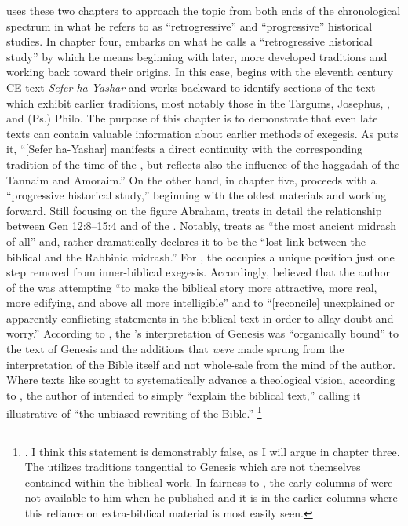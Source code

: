 \vermes uses these two chapters to approach the topic from both ends of the chronological spectrum in what he refers to as ``retrogressive'' and ``progressive'' historical studies. In chapter four, \vermes embarks on what he calls a ``retrogressive historical study'' by which he means beginning with later, more developed traditions and working back toward their origins. In this case, \vermes begins with the eleventh century CE text \emph{Sefer ha-Yashar} and works backward to identify sections of the text which exhibit earlier traditions, most notably those in the Targums, Josephus, \jub, and (Ps.) Philo. The purpose of this chapter is to demonstrate that even late texts can contain valuable information about earlier methods of exegesis. As \vermes puts it, ``[Sefer ha-Yashar] manifests a direct continuity with the corresponding tradition of the time of the \secondtemple, but reflects also the influence of the haggadah of the Tannaim and Amoraim.''%
    \autocite[95]{vermes1961}
On the other hand, in chapter five, \vermes proceeds with a ``progressive historical study,'' beginning with the oldest materials and working forward. Still focusing on the figure Abraham, \vermes treats in detail the relationship between Gen 12:8--15:4 and  of the \ga. Notably, \vermes treats \ga as ``the most ancient midrash of all''%
    \autocite[124]{vermes1961}
and, rather dramatically declares it to be the ``lost link between the biblical and the Rabbinic midrash.''%
    \autocite[124]{vermes1961}
For \vermes, the \ga occupies a unique position just one step removed from inner-biblical exegesis. Accordingly, \vermes believed that the author of the \ga was attempting ``to make the biblical story more attractive, more real, more edifying, and above all more intelligible'' and to ``[reconcile] unexplained or apparently conflicting statements in the biblical text in order to allay doubt and worry.''%
    \autocite[126]{vermes1961}
According to \vermes, the \ga's interpretation of Genesis was ``organically bound'' to the text of Genesis and the additions that \emph{were} made sprung from the interpretation of the Bible itself and not whole-sale from the mind of the author. Where texts like \jub sought to systematically advance a theological vision, according to \vermes, the author of \ga intended to simply ``explain the biblical text,'' calling it illustrative of ``the unbiased rewriting of the Bible.''%
    \footnote{\cite[126]{vermes1961}. I think this statement is demonstrably false, as I will argue in chapter three. The \ga utilizes traditions tangential to Genesis which are not themselves contained within the biblical work. In fairness to \vermes, the early columns of \ga were not available to him when he published  and it is in the earlier columns where this reliance on extra-biblical material is most easily seen.}


